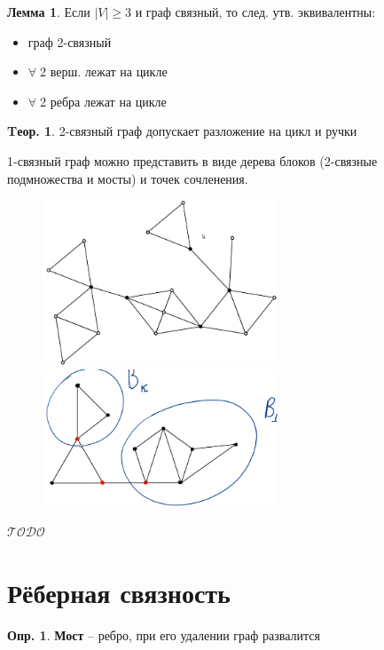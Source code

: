 \documentclass[a4paper,12pt]{article}
\numberwithin{figure}{section}
\theoremstyle{definition}
\newtheorem{definition}{Опр.}[section]
\theoremstyle{definition}
\newtheorem{theorem}{Tеор.}[section]
\newtheorem{lemma}{Лемма}[section]
\def\iiany{$\forall\;$}
\def\iiTODO{\guillemotleft$\mathcal{TODO}$\guillemotright\textellipsis}
\begin{document}
\begin{lemma}
	Если $|V| \geqslant 3$ и граф связный, то след. утв. эквивалентны:
	\begin{itemize}
		\item  граф 2-связный
		\item  \iiany 2 верш. лежат на цикле
		\item  \iiany 2 ребра лежат на цикле
	\end{itemize}
\end{lemma}

\begin{theorem}
	2-связный граф допускает разложение на цикл и ручки
\end{theorem}

1-связный граф можно представить в виде дерева блоков (2-связные подмножества и мосты) и точек сочленения.
\begin{figure}[H]
	\centering
	\includegraphics[width=7cm]{1conn-tree-of-blocks-and-junctons-fig1.png}
	\includegraphics[width=7cm]{1conn-tree-of-blocks-and-junctons-fig2.png}
\end{figure}


\iiTODO



\section{Рёберная связность}

\begin{definition}
	\textbf{Мост} -- ребро, при его удалении граф развалится
\end{definition}
\end{document}
